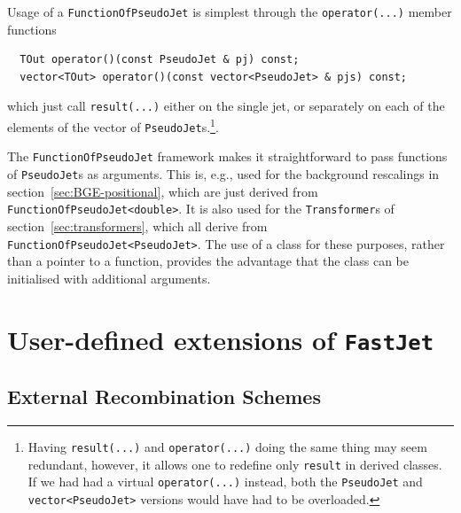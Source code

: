 \documentclass[12pt,a4]{article}
\newcommand{\fastjet}{\texttt{FastJet}\xspace}
\newcommand{\ttt}[1]{{\small\texttt{#1}}}
\newcommand{\PseudoJet}{\ttt{PseudoJet}\xspace}
\begin{document}
Usage of a \ttt{FunctionOfPseudoJet} is simplest through the
\ttt{operator(...)} member functions
\begin{lstlisting}
  TOut operator()(const PseudoJet & pj) const;
  vector<TOut> operator()(const vector<PseudoJet> & pjs) const;
\end{lstlisting}
which just call \ttt{result(...)} either on the single jet, or
separately on each of the elements of the vector of
{\PseudoJet}s.\footnote{Having \ttt{result(...)} and
  \ttt{operator(...)} doing the same thing may seem redundant,
  however, it allows one to redefine only \ttt{result} in derived
  classes.  If we had had a virtual \ttt{operator(...)} instead, both
  the \ttt{PseudoJet} and \ttt{vector<PseudoJet>} versions would have
  had to be overloaded.}.

The \ttt{FunctionOfPseudoJet} framework makes it straightforward to
pass functions of \ttt{PseudoJet}s as arguments. This is, e.g.,
used for the background rescalings in section~\ref{sec:BGE-positional},
which are just derived from \ttt{FunctionOfPseudoJet<double>}.
%
It is also used for the \ttt{Transformer}s of
section~\ref{sec:transformers}, which all derive from
\ttt{FunctionOfPseudoJet<PseudoJet>}.
%
The use of a class for these purposes, rather than a pointer to a
function, provides the advantage that the class can be initialised
with additional arguments.


\section{User-defined extensions of \fastjet}



\subsection{External Recombination Schemes}
\label{sec:recombiner}
\end{document}
